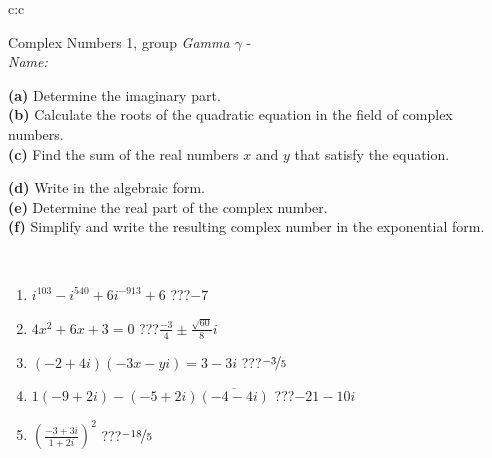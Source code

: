 \documentclass[10pt]{report}
\begin{document}
\begin{tabular}{c:c}
\begin{minipage}[c][104.5mm][t]{0.5\linewidth}
\begin{center}
\vspace{5mm}
{\huge Complex Numbers 1, group \textit{Gamma $\gamma$} -}\\[5mm]
\textit{Name:}\phantom{xxxxxxxxxxxxxxxxxxxxxxxxxxxxxxxxxxxxxxxxxxxxxxxxxxxxxxxxxxxxxxxxx}\\[5mm]
\begin{minipage}{0.95\linewidth}
\begin{center}
{\small \begin{minipage}{0.44\textwidth} \raggedright
\textbf{(a)} Determine the imaginary part. \\[1mm]
\textbf{(b)} Calculate the roots of the quadratic equation in the field of complex numbers. \\[1mm]
\textbf{(c)} Find the sum of the real numbers \(x\) and \(y\) that satisfy the equation. \end{minipage} \begin{minipage}{0.54\textwidth}
\textbf{(d)} Write in the algebraic form. \\[1mm]
\textbf{(e)} Determine the real part of the complex number. \\[1mm]
\textbf{(f)} Simplify and write the resulting complex number in the exponential form.
\end{minipage}
} \vspace{3mm}
\end{center}
\end{minipage}
\\[1mm]
\begin{minipage}{0.79\linewidth}
\begin{center}
\begin{varwidth}{\linewidth}
\setlength{\itemsep}{0pt}
\begin{enumerate}
\large
\item $i^{103}-i^{540}+6i^{-913}+6$\quad \dotfill\; ???\;\dotfill \quad $-7$
\item $4x^2+6x+3=0$\quad \dotfill\; ???\;\dotfill \quad $\frac{-3}{4} \pm{}\frac{ \sqrt{60}}{8}i$
\item $(-2+4i)(-3x-yi)=3-3i$\quad \dotfill\; ???\;\dotfill \quad $\nicefrac{-3}{5}$
\item $1(-9+2i)-(-5+2i)\overline{(-4-4i)}$\quad \dotfill\; ???\;\dotfill \quad $-21-10i$
\item $\left(\frac{-3+3i}{1+2i}\right)^2$\quad \dotfill\; ???\;\dotfill \quad $\nicefrac{-18}{5}$

\end{enumerate}
\end{varwidth}
\end{center}
\end{minipage}
\end{center}
\end{minipage}
\end{tabular}
\end{document}
